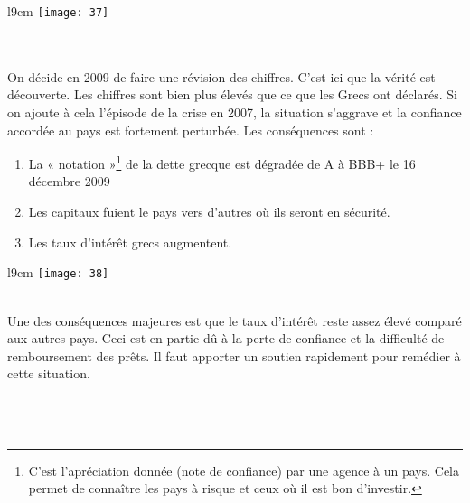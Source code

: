 \begin{wrapfigure}[10]{l}{9cm}
	\texttt{[image: 37]}
\end{wrapfigure}
\ \\\\On décide en 2009 de faire une révision des chiffres. C'est ici que la vérité est découverte. Les chiffres sont bien plus élevés que ce que les Grecs ont déclarés. Si on ajoute à cela l'épisode de la crise en 2007, la situation s'aggrave et la confiance accordée au pays est fortement perturbée. Les conséquences sont :

\begin{enumerate}
	\item La « notation »\footnote{C'est l'apréciation donnée (note de confiance) par une agence à un pays. Cela permet de connaître les pays à risque et ceux où il est bon d'investir.} de la dette grecque est dégradée de A à BBB+ le 16 décembre 2009
	      
	\item Les capitaux fuient le pays vers d'autres où ils seront en sécurité.
	      	
	\item Les taux d’intérêt grecs augmentent.
\end{enumerate}   

\begin{wrapfigure}[9]{l}{9cm}
	\texttt{[image: 38]}
\end{wrapfigure}
\ \\ Une des conséquences majeures est que le taux d'intérêt reste assez élevé comparé aux autres pays. Ceci est en partie dû à la perte de confiance et la difficulté de remboursement des prêts. Il faut apporter un soutien rapidement pour remédier à cette situation. \\\\\\\\

